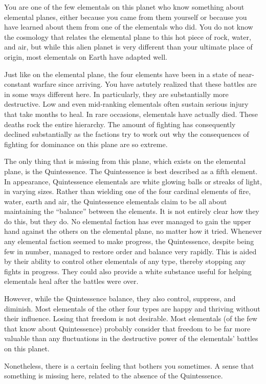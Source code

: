 \documentclass[blue]{elementals}
\begin{document}
\name{\bKnowQ{}}

You are one of the few elementals on this planet who know something about elemental planes, either because you came from them yourself or because you have learned about them from one of the elementals who did.  You do not know the cosmology that relates the elemental plane to this hot piece of rock, water, and air, but while this alien planet is very different than your ultimate place of origin, most elementals on Earth have adapted well.

Just like on the elemental plane, the four elements have been in a state of near-constant warfare since arriving.  You have astutely realized that these battles are in some ways different here.  In particularly, they are substantially more destructive.  Low and even mid-ranking elementals often sustain serious injury that take months to heal.  In rare occasions, elementals have actually died.  These deaths rock the entire hierarchy.  The amount of fighting has consequently declined substantially as the factions try to work out why the consequences of fighting for dominance on this plane are so extreme.

The only thing that is missing from this plane, which exists on the elemental plane, is the Quintessence.  The Quintessence is best described as a fifth element.  In appearance, Quintessence elementals are white glowing balls or streaks of light, in varying sizes.  Rather than wielding one of the four cardinal elements of fire, water, earth and air, the Quintessence elementals claim to be all about maintaining the ``balance'' between the elements.  It is not entirely clear how they do this, but they do.  No elemental faction has ever managed to gain the upper hand against the others on the elemental plane, no matter how it tried.  Whenever any elemental faction seemed to make progress, the Quintessence, despite being few in number, managed to restore order and balance very rapidly.  This is aided by their ability to control other elementals of any type, thereby stopping any fights in progress.  They could also provide a white substance useful for helping elementals heal after the battles were over.

However, while the Quintessence balance, they also control, suppress, and diminish.  Most elementals of the other four types are happy and thriving without their influence.  Losing that freedom is not desirable.  Most elementals (of the few that know about Quintessence) probably consider that freedom to be far more valuable than any fluctuations in the destructive power of the elementals' battles on this planet.

Nonetheless, there is a certain feeling that bothers you sometimes.  A sense that something is missing here, related to the absence of the Quintessence.
\end{document}

